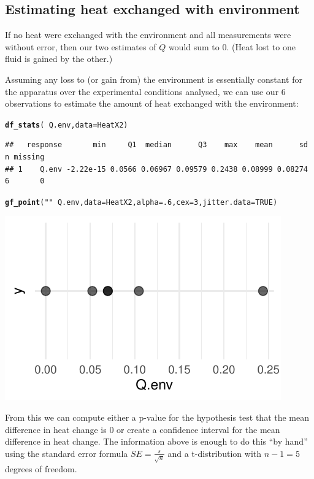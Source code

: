 \documentclass[twoside]{book}\usepackage[]{graphicx}\usepackage[]{xcolor}
\makeatletter
\def\maxwidth{ %
  \ifdim\Gin@nat@width>\linewidth
    \linewidth
  \else
    \Gin@nat@width
  \fi
}
\newcommand{\hlnum}[1]{\textcolor[rgb]{0.686,0.059,0.569}{#1}}%
\newcommand{\hlstr}[1]{\textcolor[rgb]{0.192,0.494,0.8}{#1}}%
\newcommand{\hlopt}[1]{\textcolor[rgb]{0,0,0}{#1}}%
\newcommand{\hlstd}[1]{\textcolor[rgb]{0.345,0.345,0.345}{#1}}%
\newcommand{\hlkwc}[1]{\textcolor[rgb]{0.333,0.667,0.333}{#1}}%
\newcommand{\hlkwd}[1]{\textcolor[rgb]{0.737,0.353,0.396}{\textbf{#1}}}%
\newenvironment{kframe}{%
 \def\at@end@of@kframe{}%
 \ifinner\ifhmode%
  \def\at@end@of@kframe{\end{minipage}}%
  \begin{minipage}{\columnwidth}%
 \fi\fi%
 \def\FrameCommand##1{\hskip\@totalleftmargin \hskip-\fboxsep
 \colorbox{shadecolor}{##1}\hskip-\fboxsep
     \hskip-\linewidth \hskip-\@totalleftmargin \hskip\columnwidth}%
 \MakeFramed {\advance\hsize-\width
   \@totalleftmargin\z@ \linewidth\hsize
   \@setminipage}}%
 {\par\unskip\endMakeFramed%
 \at@end@of@kframe}
\newenvironment{knitrout}{}{} %
\makeatother
\begin{document}
\subsection{Estimating heat exchanged with environment}
If no heat were exchanged with the environment and all measurements were without error,
then our two estimates of $\dot Q$ would sum to 0.  (Heat lost to one fluid is gained by the 
other.)  

Assuming any loss to (or gain from) the environment is essentially constant for
the apparatus over the experimental conditions analysed, we can use our 6
observations to estimate the amount of heat exchanged with the environment:
\begin{knitrout}
\color{fgcolor}\begin{kframe}
\begin{alltt}
\hlkwd{df_stats}\hlstd{(} \hlopt{~} \hlstd{Q.env,} \hlkwc{data} \hlstd{= HeatX2)}
\end{alltt}
\begin{verbatim}
##   response       min     Q1  median      Q3    max    mean      sd n missing
## 1    Q.env -2.22e-15 0.0566 0.06967 0.09579 0.2438 0.08999 0.08274 6       0
\end{verbatim}
\begin{alltt}
\hlkwd{gf_point}\hlstd{(} \hlstr{""} \hlopt{~} \hlstd{Q.env,} \hlkwc{data} \hlstd{= HeatX2,} \hlkwc{alpha} \hlstd{=} \hlnum{.6}\hlstd{,} \hlkwc{cex} \hlstd{=} \hlnum{3}\hlstd{,} \hlkwc{jitter.data} \hlstd{=} \hlnum{TRUE}\hlstd{)}
\end{alltt}
\end{kframe}

{\centering \includegraphics[width=\maxwidth]{figures/fig-unnamed-chunk-335-1} 

}



\end{knitrout}
From this we can compute either a p-value for the hypothesis test that the mean 
difference in heat change is 0 or create a confidence interval for the mean difference
in heat change.
The information above is enough to do this ``by hand'' using the standard error 
formula $SE = \frac{s}{\sqrt{n}}$ and a t-distribution with $n-1 = 5$ degrees of freedom.
\end{document}
